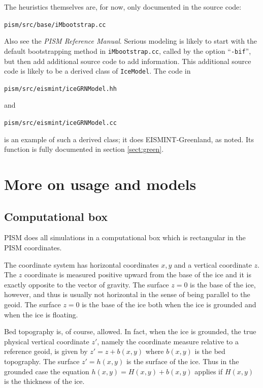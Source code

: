 \documentclass[11pt,final]{amsart}
\begin{document}
The heuristics themselves are, for now, only documented in the source code:
\begin{center}\verb|pism/src/base/iMbootstrap.cc|\end{center}
\noindent Also see the \emph{PISM Reference Manual}.  Serious modeling is likely to start with the default bootstrapping method in \verb|iMbootstrap.cc|, called by the option ``\verb|-bif|'', but then add additional source code to add information.  This additional source code is likely to be a derived class of \verb|IceModel|.  The code in 
\begin{center}\verb|pism/src/eismint/iceGRNModel.hh|\end{center}
\noindent and
\begin{center}\verb|pism/src/eismint/iceGRNModel.cc|\end{center}
\noindent is an example of such a derived class; it does EISMINT-Greenland, as noted.  Its function is fully documented in section \ref{sect:green}.


\clearpage
\newpage
\section{More on usage and models}\label{sect:usage}

\subsection{Computational box} \label{subsect:coords} PISM does all simulations in a computational box which is rectangular in the PISM coordinates.

The coordinate system has horizontal coordinates $x,y$ and a vertical coordinate $z$.  The $z$ coordinate is measured positive upward from the base of the ice and it is exactly opposite to the vector of gravity.  The surface $z=0$ is the base of the ice, however, and thus is usually not horizontal in the sense of being parallel to the geoid.   The surface $z=0$ is the base of the ice both when the ice is grounded and when the ice is floating.

Bed topography is, of course, allowed.  In fact, when the ice is grounded, the true physical vertical coordinate $z'$, namely the coordinate measure relative to a reference geoid, is given by $z'=z+b(x,y)$ where $b(x,y)$ is the bed topography.  The surface $z'=h(x,y)$ is the surface of the ice.  Thus in the grounded case the equation $h(x,y)=H(x,y)+b(x,y)$ applies if $H(x,y)$ is the thickness of the ice.
\end{document}

